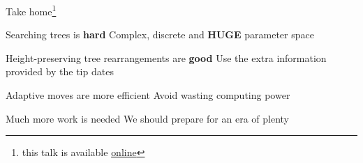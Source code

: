 \documentclass[newPxFont,numfooter,sectionpages]{beamer}
\begin{document}
\begin{frame}{Take home\footnote{\tiny this talk is available \href{https://github.com/maxbiostat/stats_seminar_2017}{online}}}
\begin{alertblock}{Searching trees is \textbf{hard}}
Complex, discrete and \textbf{HUGE} parameter space
\end{alertblock}\pause
\begin{exampleblock}{Height-preserving tree rearrangements are \textbf{good}}
Use the extra information provided by the tip dates
\end{exampleblock}\pause
\begin{block}{Adaptive moves are more efficient}
 Avoid wasting computing power
\end{block}\pause
\begingroup
{}
\begin{block}{Much more work is needed}
We should prepare for an era of plenty
\end{block}
\endgroup
\end{frame}

\begingroup
{}
\begin{frame}[plain]


\end{frame}
\endgroup
\end{document}
